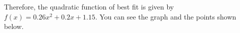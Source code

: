 \documentclass{ximera}
\begin{document}
\begin{example}
\begin{explanation}
    Therefore, the quadratic function of best fit is given by $f(x)=0.26x^2+0.2x+1.15$.  You can see the graph and the points shown below.

\begin{onlineOnly}
\begin{center}
\end{center}
\end{onlineOnly}
   
\end{explanation}
 \end{example}











\end{document}
